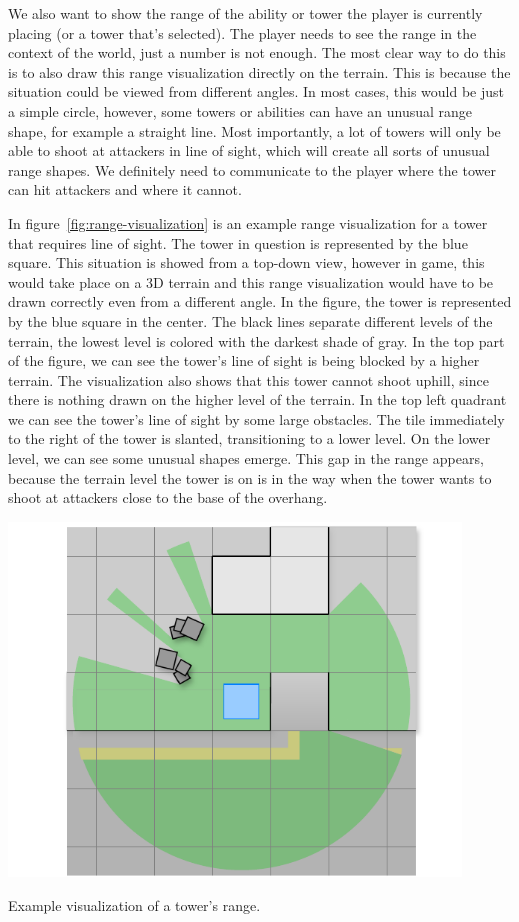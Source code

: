 We also want to show the range of the ability or tower the player is currently placing (or a tower that's selected).
The player needs to see the range in the context of the world, just a number is not enough.
The most clear way to do this is to also draw this range visualization directly on the terrain.
This is because the situation could be viewed from different angles.
In most cases, this would be just a simple circle, however, some towers or abilities can have an unusual range shape, for example a straight line.
Most importantly, a lot of towers will only be able to shoot at attackers in line of sight, which will create all sorts of unusual range shapes.
We definitely need to communicate to the player where the tower can hit attackers and where it cannot.

In figure~\ref{fig:range-visualization} is an example range visualization for a tower that requires line of sight.
The tower in question is represented by the blue square.
This situation is showed from a top-down view, however in game, this would take place on a 3D terrain and this range visualization would have to be drawn correctly even from a different angle.
In the figure, the tower is represented by the blue square in the center.
The black lines separate different levels of the terrain, the lowest level is colored with the darkest shade of gray.
In the top part of the figure, we can see the tower's line of sight is being blocked by a higher terrain.
The visualization also shows that this tower cannot shoot uphill, since there is nothing drawn on the higher level of the terrain.
In the top left quadrant we can see the tower's line of sight by some large obstacles.
The tile immediately to the right of the tower is slanted, transitioning to a lower level.
On the lower level, we can see some unusual shapes emerge.
This gap in the range appears, because the terrain level the tower is on is in the way when the tower wants to shoot at attackers close to the base of the overhang.

\begin{center}
    \captionsetup{type=figure}
    \includegraphics[width=0.9\textwidth]{img/Range visualisation.pdf}
    \caption{Example visualization of a tower's range.}
    \label{fig:range-visualization}
\end{center}

